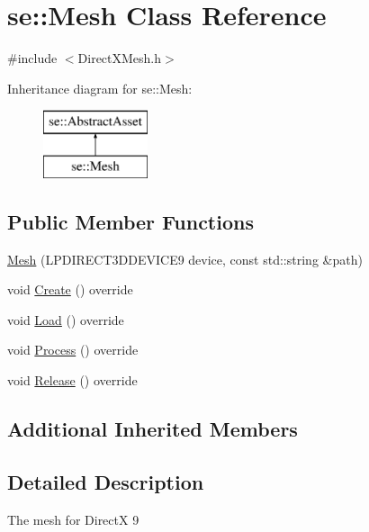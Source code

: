 \hypertarget{classse_1_1_mesh}{}\section{se\+:\+:Mesh Class Reference}
\label{classse_1_1_mesh}


{\ttfamily \#include $<$Direct\+X\+Mesh.\+h$>$}

Inheritance diagram for se\+:\+:Mesh\+:\begin{figure}[H]
\begin{center}
\leavevmode
\includegraphics[height=2.000000cm]{classse_1_1_mesh}
\end{center}
\end{figure}
\subsection*{Public Member Functions}
\begin{DoxyCompactItemize}
\item 
\mbox{\hyperlink{classse_1_1_mesh_a0427ddfbf15bff6b16a703e179e8265d}{Mesh}} (L\+P\+D\+I\+R\+E\+C\+T3\+D\+D\+E\+V\+I\+C\+E9 device, const std\+::string \&path)
\item 
void \mbox{\hyperlink{classse_1_1_mesh_a56e2d07f7b642c16e89631796a0d576e}{Create}} () override
\item 
void \mbox{\hyperlink{classse_1_1_mesh_a17116983a6c6e73770585b72332c5140}{Load}} () override
\item 
void \mbox{\hyperlink{classse_1_1_mesh_a1ae42a794ee240b5d6a0dd46aa4ea60d}{Process}} () override
\item 
void \mbox{\hyperlink{classse_1_1_mesh_afde4ccf6665a9b6c7a8f3635dd5139e0}{Release}} () override
\end{DoxyCompactItemize}
\subsection*{Additional Inherited Members}


\subsection{Detailed Description}
The mesh for DirectX 9 

